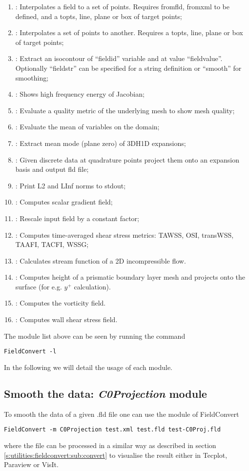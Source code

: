 \begin{enumerate}
\item {}: Interpolates a field to a set of points. Requires fromfld, fromxml to be defined, and a topts, line, plane or box of target points;
\item {}: Interpolates a set of points to another. Requires a topts, line, plane or box of target points;
\item {}: Extract an isocontour of ``fieldid'' variable and at value ``fieldvalue''. Optionally ``fieldstr'' can be specified for a string definition or ``smooth'' for smoothing;
\item {}: Shows high frequency energy of Jacobian;
\item {}: Evaluate a quality metric of the underlying mesh to show mesh quality;
\item {}: Evaluate the mean of variables on the domain;
\item {}: Extract mean mode (plane zero) of 3DH1D expansions;
\item {}: Given discrete data at quadrature points
  project them onto an expansion basis and output fld file;
\item {}: Print L2 and LInf norms to stdout;
\item {}: Computes scalar gradient field;
\item {}: Rescale input field by a constant factor;
\item {}: Computes time-averaged shear stress metrics: TAWSS, OSI, transWSS, TAAFI, TACFI, WSSG;
\item {}: Calculates stream function of a 2D incompressible flow.
\item {}: Computes height of a prismatic boundary layer mesh and projects onto the surface (for e.g. $y^+$ calculation).
\item {}: Computes the vorticity field.
\item {}: Computes wall shear stress field.
\end{enumerate}
The module list above can be seen by running the command
%
\begin{lstlisting}[style=BashInputStyle]
FieldConvert -l
\end{lstlisting}
%
In the following we will detail the usage of each module.
%
%
%

\subsection{Smooth the data: \textit{C0Projection} module}
To smooth the data of a given .fld file one can
use the  module of FieldConvert
%
\begin{lstlisting}[style=BashInputStyle]
FieldConvert -m C0Projection test.xml test.fld test-C0Proj.fld
\end{lstlisting}
%
where the file  can be processed in a similar
way as described in section \ref{s:utilities:fieldconvert:sub:convert}
to visualise the result either in Tecplot, Paraview or VisIt.

